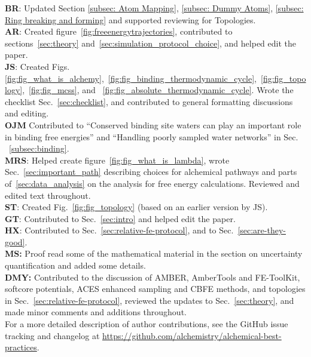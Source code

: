 \documentclass[9pt,bestpractices]{livecoms}
\newcommand{\githubrepository}{\url{https://github.com/alchemistry/alchemical-best-practices}} %
\begin{document}
\textbf{BR}: Updated Section \ref{subsec: Atom Mapping}, \ref{subsec: Dummy Atoms}, \ref{subsec: Ring breaking and forming} and supported reviewing for Topologies.\\
\textbf{AR}: Created figure~\ref{fig:freeenergytrajectories}, contributed to sections~\ref{sec:theory} and~\ref{sec:simulation_protocol_choice}, and helped edit the paper.\\
\textbf{JS}: Created Figs.~ \ref{fig:fig_what_is_alchemy},~\ref{fig:fig_binding_thermodynamic_cycle},~\ref{fig:fig_topology},~\ref{fig:fig_mcss}, and ~\ref{fig:fig_absolute_thermodynamic_cycle}. Wrote the checklist Sec.~\ref{sec:checklist}, and contributed to general formatting discussions and editing.\\
\textbf{OJM} Contributed to ``Conserved binding site waters can play an important role in binding free energies'' and ``Handling poorly sampled water networks'' in Sec. ~\ref{subsec:binding}.\\
\textbf{MRS}: Helped create figure~\ref{fig:fig_what_is_lambda}, wrote Sec.~\ref{sec:important_path} describing choices for alchemical pathways and parts of~\ref{sec:data_analysis} on the analysis for free energy calculations. Reviewed and edited text throughout.\\
\textbf{ST}: Created Fig.~\ref{fig:fig_topology} (based on an earlier version by JS).\\
\textbf{GT}: Contributed to Sec.~\ref{sec:intro} and helped edit the paper.\\
\textbf{HX}: Contributed to Sec.~\ref{sec:relative-fe-protocol}, and to Sec.~\ref{sec:are-they-good}.\\
\textbf{MS:} Proof read some of the mathematical material in the section on uncertainty quantification and added some details. \\
\textbf{DMY:} Contributed to the discussion of AMBER, AmberTools and FE-ToolKit, softcore potentials, ACES enhanced sampling and CBFE methods, and topologies in Sec.~\ref{sec:relative-fe-protocol}, reviewed the updates to Sec.~\ref{sec:theory}, and made minor comments and additions throughout. \\
For a more detailed description of author contributions,
see the GitHub issue tracking and changelog at \githubrepository.
\end{document}
